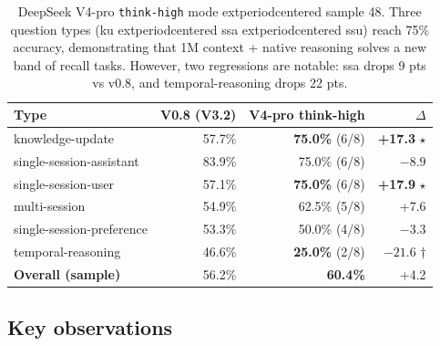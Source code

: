 \begin{table}[h]
\centering
\small
\begin{tabular}{lrrr}
\toprule
\textbf{Type} & \textbf{V0.8 (V3.2)} & \textbf{V4-pro think-high} & \textbf{\(\Delta\)} \\
\midrule
knowledge-update         & 57.7\% & \textbf{75.0\%} (6/8) & \textbf{+17.3} $\star$ \\
single-session-assistant & 83.9\% & 75.0\% (6/8) & \(-8.9\) \\
single-session-user      & 57.1\% & \textbf{75.0\%} (6/8) & \textbf{+17.9} $\star$ \\
multi-session            & 54.9\% & 62.5\% (5/8) & +7.6 \\
single-session-preference& 53.3\% & 50.0\% (4/8) & \(-3.3\) \\
temporal-reasoning       & 46.6\% & \textbf{25.0\%} (2/8) & \textbf{\(-21.6\)} $\dagger$ \\
\midrule
\textbf{Overall (sample)} & 56.2\% & \textbf{60.4\%} & +4.2 \\
\bottomrule
\end{tabular}
\caption{DeepSeek V4-pro \texttt{think-high} mode 	extperiodcentered{}  sample 48. Three
question types (ku 	extperiodcentered{}  ssa 	extperiodcentered{}  ssu) reach 75\% accuracy, demonstrating that
1M context + native reasoning solves a new band of recall tasks. However,
two regressions are notable: ssa drops 9 pts vs v0.8, and
temporal-reasoning drops 22 pts.}
\label{tab:v4-sample}
\end{table}

\subsection{Key observations}

